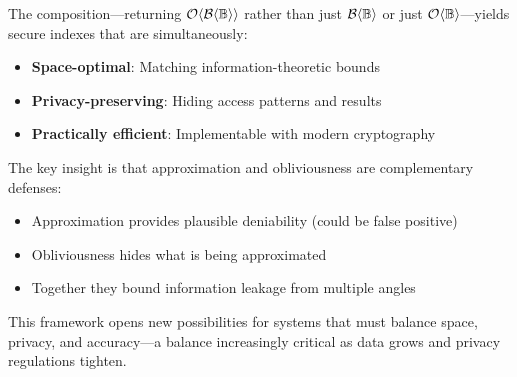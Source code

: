 \documentclass[11pt,final,hidelinks]{article}
\newcommand{\BernBool}{\mathcal{B}\langle \Bool \rangle}
\begin{document}
The composition—returning $\Obv{\BernBool}$ rather than just $\BernBool$ or just $\mathcal{O}\langle \mathbb{B} \rangle$—yields secure indexes that are simultaneously:
\begin{itemize}
    \item \textbf{Space-optimal}: Matching information-theoretic bounds
    \item \textbf{Privacy-preserving}: Hiding access patterns and results
    \item \textbf{Practically efficient}: Implementable with modern cryptography
\end{itemize}

The key insight is that approximation and obliviousness are complementary defenses:
\begin{itemize}
    \item Approximation provides plausible deniability (could be false positive)
    \item Obliviousness hides what is being approximated
    \item Together they bound information leakage from multiple angles
\end{itemize}

This framework opens new possibilities for systems that must balance space, privacy, and accuracy—a balance increasingly critical as data grows and privacy regulations tighten.


\end{document}

